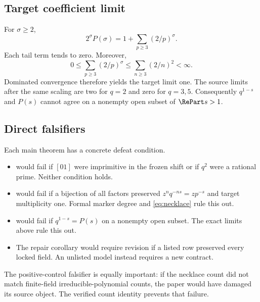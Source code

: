 \subsection{Target coefficient limit}

For $\sigma\ge2$,
\[
 2^\sigma P(\sigma)
 =1+\sum_{p\ge3}(2/p)^\sigma.
\]
Each tail term tends to zero. Moreover,
\[
 0\le \sum_{p\ge3}(2/p)^\sigma
 \le \sum_{n\ge3}(2/n)^2<\infty.
\]
Dominated convergence therefore yields the target limit one. The source
limits after the same scaling are two for $q=2$ and zero for $q=3,5$.
Consequently $q^{1-s}$ and $P(s)$ cannot agree on a nonempty open subset of
$\RePart s>1$.

\subsection{Direct falsifiers}

Each main theorem has a concrete defeat condition.

\begin{itemize}
\item {} would fail if $[01]$ were imprimitive in the frozen
  shift or if $q^2$ were a rational prime. Neither condition holds.
\item {} would fail if a bijection of all factors
  preserved $z^nq^{-ns}=zp^{-s}$ and target multiplicity one. Formal marker
  degree and \cref{eq:necklace} rule this out.
\item {} would fail if $q^{1-s}=P(s)$ on a nonempty open
  subset. The exact limits above rule this out.
\item The repair corollary would require revision if a listed row preserved
  every locked field. An unlisted model instead requires a new contract.
\end{itemize}

The positive-control falsifier is equally important: if the necklace count
did not match finite-field irreducible-polynomial counts, the paper would have
damaged its source object. The verified count identity
\citep{chebolu2026necklace} prevents that failure.
